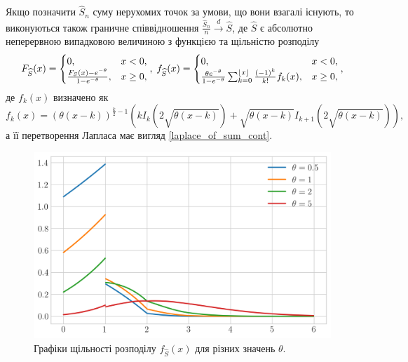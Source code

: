 \begin{theorem}
    Якщо позначити $\widehat{S}_n$ суму нерухомих точок за умови,
    що вони взагалі існують, то виконуються також граничне співвідношення
    $\frac{\widehat{S}_n}{n} \overset{d}{\longrightarrow} \widehat{S}$,
    де $\widehat{S}$ є абсолютно неперервною випадковою величиною з
    функцією та щільністю розподілу
    \begin{gather}
        F_{\widehat{S}}(x) = \begin{cases}
            0, & x < 0, \\
            \frac{F_{S}(x) - e^{-\theta}}{1 - e^{-\theta}}, & x \geq 0,
        \end{cases},\;
        f_{\widehat{S}}(x) = \begin{cases}
            0, & x < 0, \\
            \frac{\theta e^{-\theta}}{1 - e^{-\theta}}
            \sum_{k=0}^{\floor*{x}} \frac{(-1)^k}{k!} f_k(x), & x \geq 0,
        \end{cases},
    \end{gather}
    де $f_k(x)$ визначено як 
    $$f_k(x) = \left(\theta (x - k)\right)^{\frac{k}{2} - 1}
    \left(
        k I_k \left(2 \sqrt{\theta (x - k)} \right) + 
        \sqrt{\theta (x - k)} I_{k+1} \left(2 \sqrt{\theta (x - k)}\right)
    \right),$$
    а її перетворення Лапласа має вигляд \eqref{laplace_of_sum_cont}.
    \begin{figure}[H]
        \centering
        \includegraphics[scale=0.65]{plots/pdf_sum_hat.png}
        \caption{Графіки щільності розподілу $f_{\widehat{S}}(x)$ для різних значень $\theta$.}
    \end{figure}
\end{theorem}